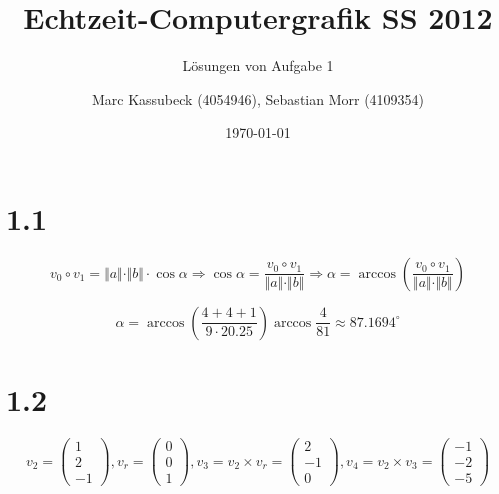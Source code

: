 \documentclass[a4paper]{scrartcl}
\title{Echtzeit-Computergrafik SS 2012}
\subtitle{Lösungen von Aufgabe 1}
\author{Marc Kassubeck (4054946), Sebastian Morr (4109354)}
\date{\today}
\begin{document}
 

\maketitle

\section*{1.1}

\[
	v_0 \circ v_1 = \Vert a\Vert \cdot \Vert b\Vert \cdot \cos \alpha
	\Rightarrow \cos \alpha = \frac{v_0 \circ v_1}{\Vert a\Vert \cdot \Vert b\Vert}
	\Rightarrow \alpha = \arccos \left(\frac{v_0 \circ v_1}{\Vert a\Vert \cdot \Vert b\Vert}\right)
\]

\[
	\alpha = \arccos \left( \frac{4 + 4 + 1}{9 \cdot 20.25} \right) \arccos \frac{4}{81} \approx 87.1694^\circ
\]

\section*{1.2}


\[
	v_2 = \begin{pmatrix}
	1 \\ 2 \\ -1
	\end{pmatrix}, v_r = \begin{pmatrix}
	0 \\ 0 \\ 1
	\end{pmatrix}, v_3 = v_2 \times v_r = \begin{pmatrix}
	2 \\ -1 \\ 0
	\end{pmatrix},
	v_4 = v_2 \times v_3 = \begin{pmatrix}
	-1 \\ -2 \\ -5
	\end{pmatrix}
\]
\end{document}
